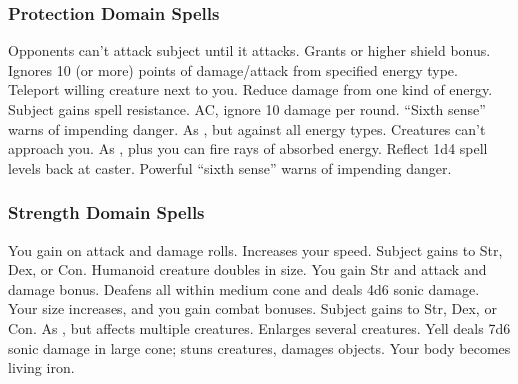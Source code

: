 \subsubsection{Protection Domain Spells}

\begin{spelllist}
   Opponents can't attack subject until it attacks.
   Grants  or higher shield bonus.
   Ignores 10 (or more) points of damage/attack from specified energy type.
   Teleport willing creature next to you.
   Reduce damage from one kind of energy.
  \spellhead[3]{}
   Subject gains spell resistance.
    AC, ignore 10 damage per round.
  \spellhead[5]{}
   ``Sixth sense'' warns of impending danger.
   As , but against all energy types.
   Creatures can't approach you.
   As , plus you can fire rays of absorbed energy.
   Reflect 1d4 spell levels back at caster.
  \spellhead[8]{}
  \spellhead[8]{}
   Powerful ``sixth sense'' warns of impending danger.
  \spellhead[9]{}
\end{spelllist}

\subsubsection{Strength Domain Spells}

\begin{spelllist}
   You gain  on attack and damage rolls.
   Increases your speed.
   Subject gains  to Str, Dex, or Con.
  \spellhead[2]{}
   Humanoid creature doubles in size.
  \spellhead[3]{}
   You gain  Str and attack and damage bonus.
   Deafens all within medium cone and deals 4d6 sonic damage.
   Your size increases, and you gain combat bonuses.
   Subject gains  to Str, Dex, or Con.
   As , but affects multiple creatures.
  \spellhead[6]{}
   Enlarges several creatures.
   Yell deals 7d6 sonic damage in large cone; stuns creatures, damages objects.
   Your body becomes living iron.
  \spellhead[8]{}
  \spellhead[9]{}
  \spellhead[9]{} 
\end{spelllist}


